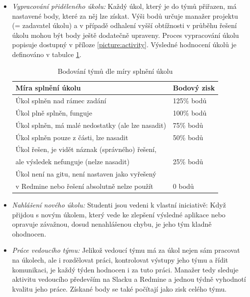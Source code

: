 \begin{itemize}
	\item \emph{Vypracování přiděleného úkolu:} Každý úkol, který je do týmů přiřazen, má nastavené body, které za něj lze získat. Výši bodů určuje manažer projektu (= zadavatel úkolu) a v případě odhalení vyšší obtížnosti v průběhu řešení úkolu mohou být body ještě dodatečně upraveny. Proces vypracování úkolu popisuje  dostupný v příloze \ref{picture:activity}. Výsledné hodnocení úkolů je definováno v tabulce \ref{table:ranking}.
	\begin{table}[h]
		\caption{Bodování týmů dle míry splnění úkolu}
		\label{table:ranking}
		\begin{tabular}{@{}ll@{}}
			\toprule
			Míra splnění úkolu                                                                           & Bodový zisk \\ \midrule
			Úkol splněn nad rámec zadání                                                                 & 125\% bodů  \\
			Úkol plně splněn, funguje                                                                    & 100\% bodů  \\
			Úkol splněn, má malé nedostatky (ale lze nasadit)                                            & 75\% bodů   \\
			Úkol splněn pouze z části, lze nasadit                                                       & 50\% bodů   \\
			Úkol řešen, je vidět náznak (správného) řešení,\\ale výsledek nefunguje (nelze nasadit)      & 25\% bodů   \\
			Úkol není na gitu, není nastaven jako vyřešený\\v Redmine nebo řešení absolutně nelze použít & 0 bodů   \\ \bottomrule
		\end{tabular}
	\end{table}
	\item \emph{Nahlášení nového úkolu:} Studenti jsou vedeni k vlastní iniciativě: Když přijdou s novým úkolem, který vede ke zlepšení výsledné aplikace nebo opravuje závažnou, dosud nenahlášenou chybu, je jeho tým kladně ohodnocen.
	\item \emph{Práce vedoucího týmu:} Jelikož vedoucí týmu má za úkol nejen sám pracovat na úkolech, ale i rozdělovat práci, kontrolovat výstupy jeho týmu a řídit komunikaci, je každý týden hodnocen i za tuto práci. Manažer tedy sleduje aktivitu vedoucího především na Slacku a Redmine a jednou týdně vyhodnotí kvalitu jeho práce. Získané body se také počítají jako zisk celého týmu.
\end{itemize}

